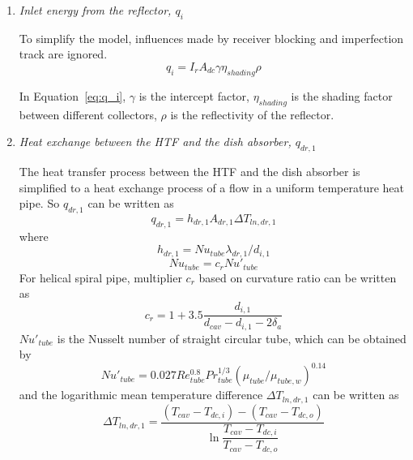 \begin{enumerate}[label=(\arabic*)]
  \item \emph{Inlet energy from the reflector, $q_i$}
  
  To simplify the model, influences made by receiver blocking and imperfection track are ignored.  
  \begin{equation}\label{eq:q_i}
      q_i = I_r A_{dc} \gamma \eta_{shading} \rho
  \end{equation}
  
  In Equation~\ref{eq:q_i}, $\gamma$ is the intercept factor, $\eta_{shading}$ is the shading factor between different collectors, $\rho$ is the reflectivity of the reflector.
  \item \emph{Heat exchange between the HTF and the dish absorber, $q_{dr,1}$}
  
  The heat transfer process between the HTF and the dish absorber is simplified to a heat exchange process of a flow in a uniform temperature heat pipe. So $q_{dr,1}$ can be written as  
  \begin{equation}\label{eq:q_dr_1}
      q_{dr,1} = h_{dr,1}A_{dr,1}\Delta T_{ln,dr,1}
  \end{equation}
  where  
  \begin{equation}
      h_{dr,1} = Nu_{tube}\lambda_{dr,1} / d_{i,1}
\end{equation}
\begin{equation}
      Nu_{tube} = c_r Nu'_{tube}
\end{equation}
    For helical spiral pipe, multiplier $c_r$ based on curvature ratio can be written as~\cite{Pablo2008}
\begin{equation}
	c_{r}=1+3.5\frac{d_{i,1}}{d_{cav}-d_{i,1}-2\delta_{a}}
\end{equation}
$Nu'_{tube}$ is the Nusselt number of straight circular tube, which can be obtained by~\cite{Serth2007}
\begin{equation}
	Nu'_{tube}= 0.027Re_{tube}^{0.8}Pr_{tube}^{1/3}(\mu_{tube}/\mu_{tube,w})^{0.14}
\end{equation}
and the logarithmic mean temperature difference $\Delta{}T_{ln,dr,1}$ can be written as
\begin{equation}
	\Delta{}T_{ln,dr,1}=\frac{(T_{cav}-T_{dc,i})-(T_{cav}-T_{dc,o})}{\ln\dfrac{T_{cav}-T_{dc,i}}{T_{cav}-T_{dc,o}}}
\end{equation}


\end{enumerate}
